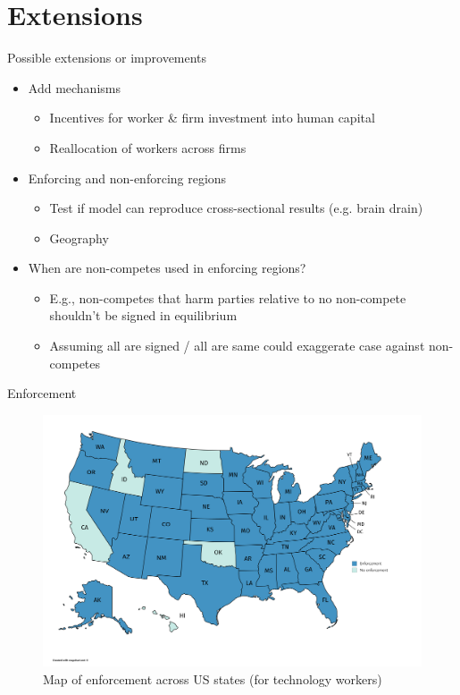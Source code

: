 \documentclass[english,usenames,dvipsnames]{beamer}
\begin{document}
\section{Extensions}
\begin{frame}{Possible extensions or improvements}
\begin{itemize}
	\item Add mechanisms
	\begin{itemize}
		\item Incentives for worker \& firm investment into human capital
		\item Reallocation of workers across firms 
	\end{itemize}
	\item Enforcing and non-enforcing regions
	\begin{itemize}
		\item Test if model can reproduce cross-sectional results (e.g. brain drain)
		\item Geography
	\end{itemize}
	\item When are non-competes used in enforcing regions?
	\begin{itemize}
		\item E.g., non-competes that harm parties relative to no non-compete shouldn't be signed in equilibrium
		\item Assuming all are signed / all are same could exaggerate case against non-competes
	\end{itemize}
\end{itemize}
\end{frame}


\begin{frame}{Enforcement}\label{mapofenforcement}
\hyperlink{Motivation}{}

\begin{figure}
	\caption{Map of enforcement across US states (for technology workers)}
	
	\includegraphics[scale=0.05]{figures/map_of_enforcement}
	
\end{figure}
\end{frame}
\end{document}
